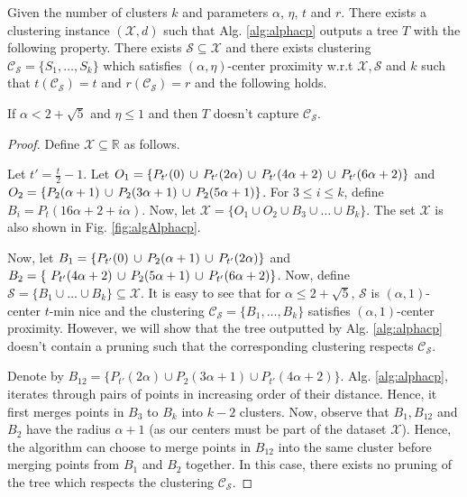\documentclass[anon,12pt]{colt2016} %
\newcommand{\mc}{\mathcal}
\begin{document}
\begin{theorem}
\label{thm:algAlphacp}
Given the number of clusters $k$ and parameters $\alpha$, $\eta$, $t$ and $r$. There exists a clustering instance $(\mc X, d)$ such that Alg. \ref{alg:alphacp} outputs a tree $T$ with the following property. There exists $\mc S \subseteq \mc X$ and there exists clustering $\mc C_{\mc S} = \{S_1, \ldots, S_k\}$ which satisfies $(\alpha, \eta)$-center proximity w.r.t $\mc X, \mc S$ and $k$ such that $ t(\mc C_{\mc S}) = t$ and $r(\mc C_{\mc S}) = r$ and the following holds. 

If $\alpha < 2 + \sqrt 5$ and $\eta \le 1$ and then $T$ doesn't capture $\mc C_{\mc S}$.
\end{theorem}

\begin{proof}
Define $\mc X \subseteq \mathbb{R}$ as follows. 

Let $t' = \frac{t}{2}-1$. Let $O_1 = \{P_{t'}(0) \thinspace\cup\thinspace P_{t'}(2\alpha) \thinspace\cup\thinspace P_{t'}(4\alpha+2) \thinspace\cup\thinspace P_{t'}(6\alpha+2)\}$ and $O_2 = \{P_{2}(\alpha+1) \thinspace\cup\thinspace P_{2}(3\alpha+1) \thinspace\cup\thinspace P_{2}(5\alpha+1) \}$. For $3\le i\le k$, define $B_i = P_t (16\alpha+2+i \alpha )$. Now, let $\mc X = \{ O_1 \cup O_2 \cup B_3 \cup \ldots \cup B_k \}$. The set $\mc X$ is also shown in Fig. \ref{fig:algAlphacp}.

Now, let $B_1 = \{P_{t'}(0) \thinspace\cup\thinspace  P_{2}(\alpha+1) \thinspace\cup\thinspace P_{t'}(2\alpha) \}$ and $B_2 = \{\ P_{t'}(4\alpha+2) \thinspace\cup\thinspace P_{2}(5\alpha+1)\thinspace\cup\thinspace P_{t'}(6\alpha+2)\}$. Now, define $\mc S = \{B_1 \cup \ldots \cup B_k\} \subseteq \mc X$. It is easy to see that for $\alpha \le 2+\sqrt{5}$, $\mc S$ is $(\alpha, 1)$-center $t$-min nice and the clustering $\mc C_{\mc S} = \{B_1, \ldots, B_k\}$ satisfies $(\alpha, 1)$-center proximity. However, we will show that the tree outputted by Alg. \ref{alg:alphacp} doesn't contain a pruning such that the corresponding clustering respects $\mc C_{\mc S}$.

Denote by $B_{12} = \{P_{t'}(2\alpha) \cup P_{2}(3\alpha+1) \cup P_{t'}(4\alpha+2) \}$. Alg. \ref{alg:alphacp}, iterates through pairs of points in increasing order of their distance. Hence, it first merges points in $B_3$ to $B_k$ into $k-2$ clusters. Now, observe that $B_1, B_{12}$ and $B_{2}$ have the radius $\alpha + 1$ (as our centers must be part of the dataset $\mc X$). Hence, the algorithm can choose to merge points in $B_{12}$ into the same cluster before merging points from $B_1$ and $B_2$ together. In this case, there exists no pruning of the tree which respects the clustering $\mc C_{\mc S}$.
\end{proof}
\end{document}
